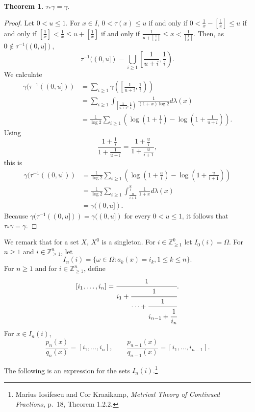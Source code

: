 \documentclass{article}
\theoremstyle{definition}
\newtheorem{theorem}{Theorem}
\theoremstyle{definition}
\begin{document}
\begin{theorem}
$\tau_*\gamma=\gamma$.
\end{theorem}
\begin{proof}
Let $0<u \leq 1$. For $x \in I$, $0<\tau(x) \leq u$ if and only if
$0<\frac{1}{x}-\left[\frac{1}{x}\right] \leq u$ if and only if
$\left[\frac{1}{x}\right] < \frac{1}{x} \leq u + \left[\frac{1}{x}\right]$ if
and only if
$\frac{1}{u + \left[\frac{1}{x}\right]} \leq x < \frac{1}{\left[\frac{1}{x}\right]}$. 
Then, as $0 \not \in \tau^{-1}((0,u])$, 
\[
\tau^{-1}((0,u]) = \bigcup_{i \geq 1} \left[ \frac{1}{u+i},\frac{1}{i}\right).
\]
We calculate
\begin{align*}
\gamma(\tau^{-1}((0,u]))&=\sum_{i \geq 1} \gamma\left( \left[ \frac{1}{u+i},\frac{1}{i}\right)\right)\\
&=\sum_{i \geq 1} \int_{\left[ \frac{1}{u+i},\frac{1}{i}\right)} \frac{1}{(1+x) \log 2} d\lambda(x)\\
&= \frac{1}{\log 2}  \sum_{i \geq 1}\left(\log\left(1+\frac{1}{i}\right)-\log\left(1+\frac{1}{u+i}\right)\right).
\end{align*}
Using
\[
\frac{1+\frac{1}{i}}{1+\frac{1}{u+i}} = \frac{1+\frac{u}{i}}{1+\frac{u}{i+1}},
\]
this is
\begin{align*}
\gamma(\tau^{-1}((0,u]))&= \frac{1}{\log 2}  \sum_{i \geq 1} \left( \log\left(1+\frac{u}{i}\right)-\log\left(1+\frac{u}{i+1}\right) \right)\\
&=\frac{1}{\log 2}  \sum_{i \geq 1} \int_{\frac{u}{i+1}}^{\frac{u}{i}} \frac{1}{1+x} d\lambda(x)\\
&=\gamma((0,u]).
\end{align*}
Because $\gamma(\tau^{-1}((0,u]))=\gamma((0,u])$ for every $0<u \leq 1$, it follows that $\tau_*\gamma=\gamma$.
\end{proof}


We remark that for a set $X$, $X^0$ is a singleton.
For $i \in \mathbb{Z}_{\geq 1}^0$ let $I_0(i)=\Omega$. 
For $n \geq 1$ and $i \in \mathbb{Z}_{\geq 1}^n$, 
let 
\[
I_n(i) = \{\omega \in \Omega: a_k(x) = i_k, 1 \leq k \leq n\}.
\]
For $n \geq 1$ and for $i \in \mathbb{Z}_{\geq 1}^n$, define
\[
[i_1,\ldots,i_n]=\cfrac{1}{i_1+\cfrac{1}{\cdots+\cfrac{1}{i_{n-1}+\cfrac{1}{i_n}}}}.
\]
For $x \in I_n(i)$, 
\[
\frac{p_n(x)}{q_n(x)} = [i_1,\ldots,i_n],
\qquad \frac{p_{n-1}(x)}{q_{n-1}(x)} = [i_1,\ldots,i_{n-1}].
\]


The following is an expression for the sets $I_n(i)$.\footnote{Marius Iosifescu and Cor Kraaikamp,
{\em Metrical Theory of Continued Fractions}, p.~18, Theorem 1.2.2.}
\end{document}
